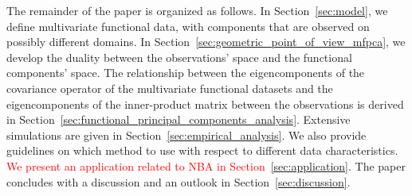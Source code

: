 The remainder of the paper is organized as follows. In Section~\ref{sec:model}, we define multivariate functional data, with components that are observed on possibly different domains. In Section~\ref{sec:geometric_point_of_view_mfpca}, we develop the duality between the observations' space and the functional components' space. The relationship between the eigencomponents of the covariance operator of the multivariate functional datasets and the eigencomponents of the inner-product matrix between the observations is derived in Section~\ref{sec:functional_principal_components_analysis}. Extensive simulations are given in Section~\ref{sec:empirical_analysis}. We also provide guidelines on which method to use with respect to different data characteristics. \textcolor{red}{We present an application related to NBA in Section~\ref{sec:application}}. The paper concludes with a discussion and an outlook in Section~\ref{sec:discussion}.

